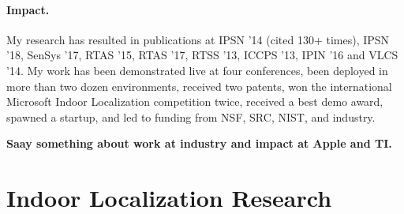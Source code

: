 \documentclass[10pt]{article}
\begin{document}





\paragraph{Impact. }
My research has resulted in publications at IPSN '14 (cited 130+
times), IPSN '18, SenSys '17, RTAS '15, RTAS '17, RTSS '13, ICCPS '13,
IPIN '16 and VLCS '14. My work has been demonstrated live at four
conferences, been deployed in more than two dozen environments,
received two patents, won the international Microsoft Indoor
Localization competition twice, received a best demo award, spawned a
startup, and led to funding from NSF, SRC, NIST, and industry.

{\bf Saay something about work at industry and impact at Apple and TI.}




\section{Indoor Localization Research}
\end{document}
